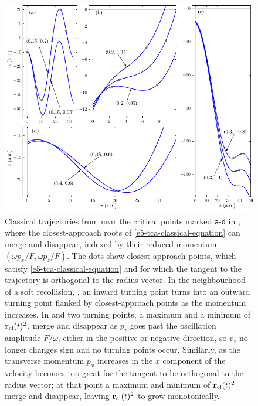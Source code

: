 \begin{figure}[t]
\begin{center}
  \subfigure{\label{f5-sample-trajectories-a}}
  \subfigure{\label{f5-sample-trajectories-b}}
  \subfigure{\label{f5-sample-trajectories-c}}
  \subfigure{\label{f5-sample-trajectories-d}}
  \includegraphics[scale=1]{5-Quantum-orbits/Figures/figure5H.pdf}
\end{center}   
  \caption[
  Classical trajectories near the critical points of the closest-approach surface
  ]{
  Classical trajectories from near the critical points marked \texttt{a}-\texttt{d} in , where the closest-approach roots of \eqref{e5-tca-classical-equation} can merge and disappear, indexed by their reduced momentum $(\omega p_x/F,\omega p_z/F)$. The dots show closest-approach points, which satisfy \eqref{e5-tca-classical-equation} and for which the tangent to the trajectory is orthogonal to the radius vector.
  In the neighbourhood of a soft recollision, \protect{}, an inward turning point turns into an outward turning point flanked by closest-approach points as the momentum increases.
  In \protect{} and \protect{} two turning points, a maximum and a minimum of $\vb{r}_{\mathrm{cl}}(t)^2$, merge and disappear as $p_z$ goes past the oscillation amplitude $F/\omega$, either in the positive \protect{} or negative \protect{} direction, so $v_z$ no longer changes sign and no turning points occur.
  Similarly, as the transverse momentum $p_x$ increases in \protect{} the $x$ component of the velocity becomes too great for the tangent to be orthogonal to the radius vector; at that point a maximum and minimum of $\vb{r}_{\mathrm{cl}}(t)^2$ merge and disappear, leaving $\vb{r}_{\mathrm{cl}}(t)^2$ to grow monotonically.
  }
  \label{f5-sample-trajectories}
\end{figure}


